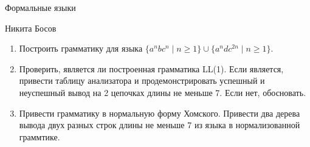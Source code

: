 \documentclass[12pt]{article}
\begin{document}
\begin{center}
{\LARGE Формальные языки}

\bigskip

{\Large Никита Босов}
\end{center} 

\bigskip



\begin{enumerate}
  \item Построить грамматику для языка $\{ a^n b c^n \mid n \geq 1 \} \cup \{ a^n d c^{2n} \mid n \geq 1 \}$.
  \item Проверить, является ли построенная грамматика LL(1). Если является, привести таблицу анализатора и продемонстрировать успешный и неуспешный вывод на 2 цепочках длины не меньше 7. Если нет, обосновать. 
  \item Привести грамматику в нормальную форму Хомского. Привести два дерева вывода двух разных строк длины не меньше 7 из языка в нормализованной граммтике. 
\end{enumerate}
\end{document}
